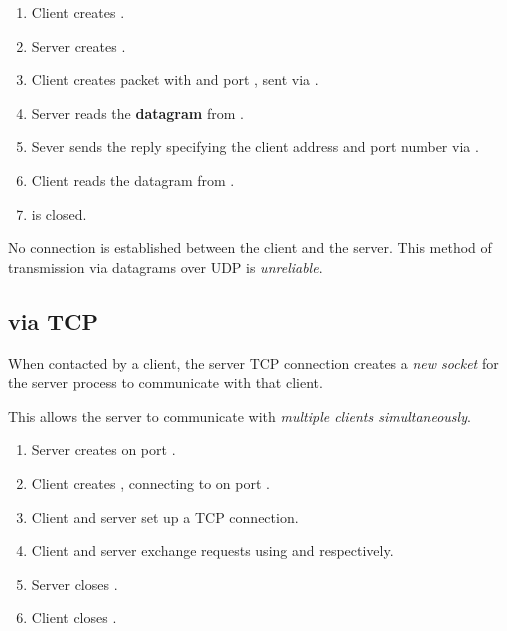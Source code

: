 \begin{enumerate}
    \item Client creates .
    \item Server creates .
    \item Client creates packet with  and port , sent via .
    \item Server reads the \textbf{datagram} from .
    \item Sever sends the reply specifying the client address and port number via .
    \item Client reads the datagram from .
    \item {} is closed.
\end{enumerate}

No connection is established between the client and the server.
This method of transmission via datagrams over UDP is \emph{unreliable}.

\subsection{via TCP}
When contacted by a client, the server TCP connection creates a \emph{new socket} for the
server process to communicate with that client.

This allows the server to communicate with \emph{multiple clients simultaneously}.

\begin{enumerate}
    \item Server creates  on port .
    \item Client creates , connecting to  on port .
    \item Client and server set up a TCP connection.
    \item Client and server exchange requests using  and 
    respectively.
    \item Server closes .
    \item Client closes .
\end{enumerate}